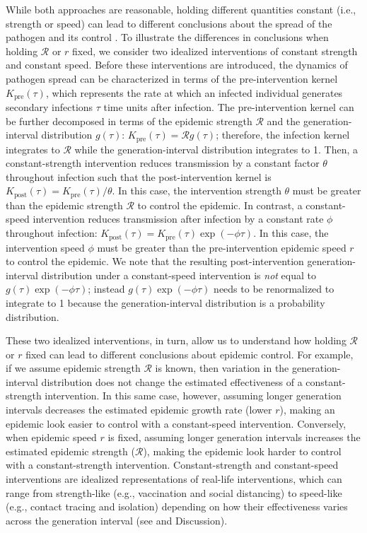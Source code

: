 \documentclass[12pt]{article}
\newcommand{\RR}{\ensuremath{{\mathcal R}}\xspace}
\begin{document}
While both approaches are reasonable, holding different quantities constant (i.e., strength or speed) can lead to different conclusions about the spread of the pathogen and its control \citep{doi:10.1098/rspb.2020.1556}.
To illustrate the differences in conclusions when holding $\RR$ or $r$ fixed, we consider two idealized interventions of constant strength and constant speed.
Before these interventions are introduced, the dynamics of pathogen spread can be characterized in terms of the pre-intervention kernel $K_{\mathrm{pre}}(\tau)$, which represents the rate at which an infected individual generates secondary infections $\tau$ time units after infection.
The pre-intervention kernel can be further decomposed in terms of the epidemic strength $\RR$ and the generation-interval distribution $g(\tau)$: $K_{\mathrm{pre}}(\tau) = \RR g(\tau)$;
therefore, the infection kernel integrates to $\RR$ while the generation-interval distribution integrates to 1.
Then, a constant-strength intervention reduces transmission by a constant factor $\theta$ throughout infection such that the post-intervention kernel is $K_{\mathrm{post}}(\tau) = K_{\mathrm{pre}}(\tau)/\theta$.
In this case, the intervention strength $\theta$ must be greater than the epidemic strength $\RR$ to control the epidemic.
In contrast, a constant-speed intervention reduces transmission after infection by a constant rate $\phi$ throughout infection: $K_{\mathrm{post}}(\tau) = K_{\mathrm{pre}}(\tau) \exp(-\phi \tau)$.
In this case, the intervention speed $\phi$ must be greater than the pre-intervention epidemic speed $r$ to control the epidemic.
We note that the resulting post-intervention generation-interval distribution under a constant-speed intervention is \emph{not} equal to $g(\tau) \exp(-\phi \tau)$; instead $g(\tau) \exp(-\phi \tau)$ needs to be renormalized to integrate to 1 because the generation-interval distribution is a probability distribution.

These two idealized interventions, in turn, allow us to understand how holding $\RR$ or $r$ fixed can lead to different conclusions about epidemic control.
For example, if we assume epidemic strength $\RR$ is known, then variation in the generation-interval distribution does not change the estimated effectiveness of a constant-strength intervention.
In this same case, however, assuming longer generation intervals decreases the estimated epidemic growth rate (lower $r$), making an epidemic look easier to control with a constant-speed intervention.
Conversely, when epidemic speed $r$ is fixed, assuming longer generation intervals increases the estimated epidemic strength ($\RR$), making the epidemic look harder to control with a constant-strength intervention.
Constant-strength and constant-speed interventions are idealized representations of real-life interventions, which can range from strength-like (e.g., vaccination and social distancing) to speed-like (e.g., contact tracing and isolation) depending on how their effectiveness varies across the generation interval (see \cite{doi:10.1098/rspb.2020.1556} and Discussion).
\end{document}
